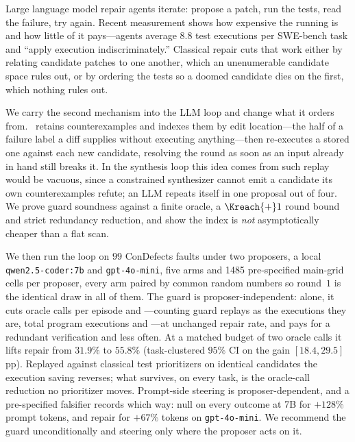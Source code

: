Large language model repair agents iterate: propose a patch, run the tests,
read the failure, try again. Recent measurement shows how expensive the running
is and how little of it pays---agents average $8.8$ test executions per
SWE-bench task and ``apply execution indiscriminately.'' Classical repair cuts
that work either by relating candidate patches to one another, which an
unenumerable candidate space rules out, or by ordering the tests so a doomed
candidate dies on the first, which nothing rules out.

We carry the second mechanism into the LLM loop and change what it orders from.
\CEGMem\ retains counterexamples and indexes them by edit location---the half
of a failure label a diff supplies without executing anything---then
re-executes a stored one against each new candidate, resolving the round as
soon as an input already in hand still breaks it. In the synthesis loop this
idea comes from such replay would be vacuous, since a constrained synthesizer
cannot emit a candidate its own counterexamples refute; an LLM repeats itself
in one proposal out of four. We prove guard soundness against a finite oracle,
a $\Kreach{+}1$ round bound and strict redundancy reduction, and show the index
is \emph{not} asymptotically cheaper than a flat scan.

We then run the loop on $99$ ConDefects faults under two proposers, a local
\texttt{qwen2.5-coder:7b} and \texttt{gpt-4o-mini}, five arms and \num{1485}
pre-specified main-grid cells per proposer, every arm paired by common random
numbers so round~$1$ is the identical draw in all of them. The guard is
proposer-independent: alone, it cuts oracle calls per episode  and
---counting guard replays as the executions they are, total program
executions  and ---at unchanged repair rate, and pays for a
redundant verification  and  less often. At a matched budget of
two oracle calls it lifts repair from $31.9\%$ to $55.8\%$ (task-clustered $95\%$
CI on the gain $[18.4, 29.5]$\,pp). Replayed against classical test
prioritizers on identical candidates the execution saving reverses; what
survives, on every task, is the oracle-call reduction no prioritizer moves.
Prompt-side steering is proposer-dependent, and a pre-specified falsifier
records which way: null on every outcome at 7B for $+128\%$ prompt tokens, and
 repair for $+67\%$ tokens on \texttt{gpt-4o-mini}. We recommend the
guard unconditionally and steering only where the proposer acts on it.
